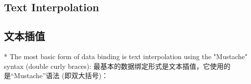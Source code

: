 \begin{paracol}{2}
\subsection{Text Interpolation}
\switchcolumn
\subsection{文本插值}
\switchcolumn[0]*%
The most basic form of data binding is text interpolation using the
"Mustache" syntax (double curly braces):
\switchcolumn
最基本的数据绑定形式是文本插值，它使用的是``Mustache''语法
(即双大括号)：
\end{paracol}
